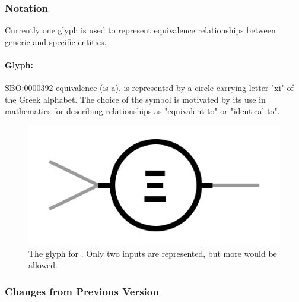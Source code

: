 \begin{valrules}
\end{valrules}

\subsubsection{Notation}

Currently one glyph is used to represent equivalence relationships between generic and specific entities.

\paragraph{Glyph: }\label{sec:techref:equivalence}

\begin{glyphDescription}
 \glyphSboTerm SBO:0000392 equivalence (is a).
 \glyphNode {} is represented by a circle carrying letter "xi" of the Greek alphabet. The choice of the symbol is motivated by its use in mathematics for describing relationships as "equivalent to" or "identical to". 
\end{glyphDescription}

\begin{figure}[htb]
  \centering
  \includegraphics[scale = 0.5]{images/equivalence}
  \caption{The \PD glyph for . Only two inputs are represented, but more would be allowed.}
  \label{fig:techref:equivalence}
\end{figure}

\subsubsection{Changes from Previous Version}

